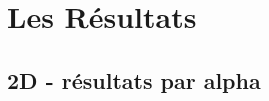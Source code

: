 
\chapter{Les Résultats} 	
\label{Chapter3} 		


\section{2D - résultats par alpha}
\label{sec:Ch3.1}

